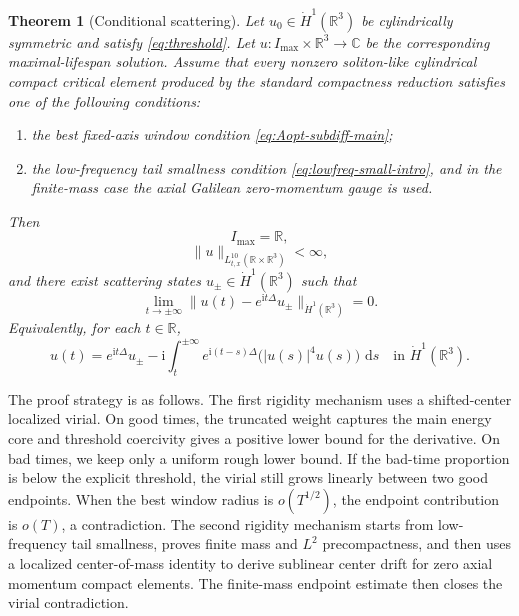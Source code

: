 \documentclass[preprint,12pt]{elsarticle}
\numberwithin{equation}{section}
\newcommand{\R}{\mathbb R}
\newcommand{\C}{\mathbb C}
\newcommand{\ii}{\mathrm i}
\newcommand{\dd}{\,\mathrm d}
\newtheorem{theorem}{Theorem}[section]
\theoremstyle{remark}
\begin{document}
\begin{theorem}[Conditional scattering]\label{thm:conditional-scattering}
Let $u_0\in\dot H^1(\R^3)$ be cylindrically symmetric and satisfy \eqref{eq:threshold}.  Let $u:I_{\max}\times\R^3\to\C$ be the corresponding maximal-lifespan solution.  Assume that every nonzero soliton-like cylindrical compact critical element produced by the standard compactness reduction satisfies one of the following conditions:
\begin{enumerate}[label=\textup{(\roman*)}]
\item the best fixed-axis window condition \eqref{eq:Aopt-subdiff-main};
\item the low-frequency tail smallness condition \eqref{eq:lowfreq-small-intro}, and in the finite-mass case the axial Galilean zero-momentum gauge is used.
\end{enumerate}
Then
\begin{equation}\label{eq:global-lifespan-intro}
  I_{\max}=\R,
\end{equation}
\begin{equation}\label{eq:scatter-norm-intro}
  \|u\|_{L^{10}_{t,x}(\R\times\R^3)}<\infty,
\end{equation}
and there exist scattering states $u_\pm\in\dot H^1(\R^3)$ such that
\begin{equation}\label{eq:scattering-states-intro}
  \lim_{t\to\pm\infty}\|u(t)-e^{\ii t\Delta}u_\pm\|_{\dot H^1(\R^3)}=0.
\end{equation}
Equivalently, for each $t\in\R$,
\begin{equation}\label{eq:duhamel-scatter-intro}
  u(t)=e^{\ii t\Delta}u_\pm-\ii\int_t^{\pm\infty}e^{\ii(t-s)\Delta}\bigl(|u(s)|^4u(s)\bigr)\,\dd s
  \quad\text{in }\dot H^1(\R^3).
\end{equation}
\end{theorem}

The proof strategy is as follows.  The first rigidity mechanism uses a shifted-center localized virial.  On good times, the truncated weight captures the main energy core and threshold coercivity gives a positive lower bound for the derivative.  On bad times, we keep only a uniform rough lower bound.  If the bad-time proportion is below the explicit threshold, the virial still grows linearly between two good endpoints.  When the best window radius is $o(T^{1/2})$, the endpoint contribution is $o(T)$, a contradiction.  The second rigidity mechanism starts from low-frequency tail smallness, proves finite mass and $L^2$ precompactness, and then uses a localized center-of-mass identity to derive sublinear center drift for zero axial momentum compact elements.  The finite-mass endpoint estimate then closes the virial contradiction.
\end{document}
